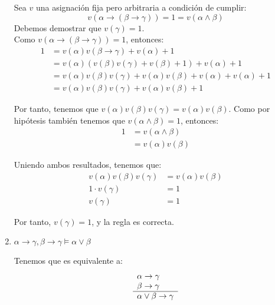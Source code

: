 \begin{ejercicio*}
\begin{enumerate}
        Sea $v$ una asignación fija pero arbitraria a condición de cumplir:
        \begin{equation*}
            v(\alpha\rightarrow(\beta\rightarrow\gamma)) = 1 = v(\alpha\land \beta)
        \end{equation*}
        Debemos demostrar que $v(\gamma)=1$.\\

        Como $v(\alpha\rightarrow(\beta\rightarrow\gamma))=1$, entonces:
        \begin{align*}
            1 &= v(\alpha)v(\beta\rightarrow\gamma)+v(\alpha)+1\\
            &= v(\alpha)(v(\beta)v(\gamma)+v(\beta)+1)+v(\alpha)+1\\
            &= v(\alpha)v(\beta)v(\gamma)+v(\alpha)v(\beta)+v(\alpha)+v(\alpha)+1\\
            &= v(\alpha)v(\beta)v(\gamma)+v(\alpha)v(\beta)+1
        \end{align*}

        Por tanto, tenemos que $v(\alpha)v(\beta)v(\gamma)=v(\alpha)v(\beta)$.
        Como por hipótesis también tenemos que $v(\alpha\land\beta)=1$, entonces:
        \begin{align*}
            1 &= v(\alpha \land \beta)\\
            &= v(\alpha)v(\beta)
        \end{align*}

        Uniendo ambos resultados, tenemos que:
        \begin{align*}
            v(\alpha)v(\beta)v(\gamma)&=v(\alpha)v(\beta)\\
            1\cdot v(\gamma)&=1\\
            v(\gamma)&=1
        \end{align*}
        
        Por tanto, $v(\gamma)=1$, y la regla es correcta.

        \item $\alpha\rightarrow \gamma, \beta\rightarrow \gamma \models \alpha\lor\beta$

        Tenemos que es equivalente a:
        \begin{equation*}
            \begin{array}{l}
                \alpha\rightarrow\gamma\\
                \beta\rightarrow\gamma\\ \hline
                \multicolumn{1}{c}{\alpha\lor\beta \rightarrow\gamma}        
            \end{array}
        \end{equation*}


\end{enumerate}
\end{ejercicio*}
